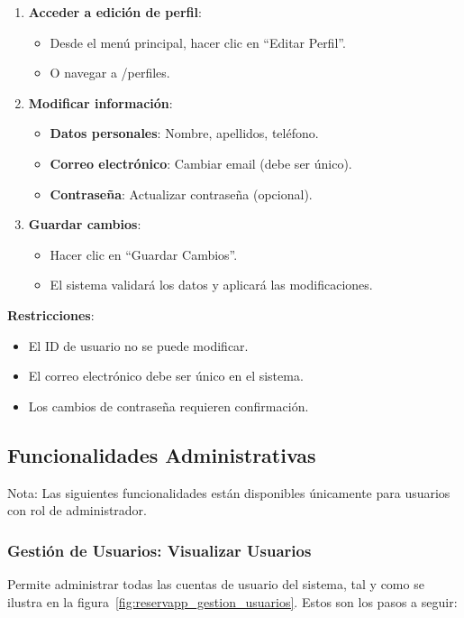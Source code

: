 \begin{enumerate}
   \item \textbf{Acceder a edición de perfil}:
   \begin{itemize}
      \item Desde el menú principal, hacer clic en ``Editar Perfil''.
      \item O navegar a /perfiles.
   \end{itemize}
   \item \textbf{Modificar información}:
   \begin{itemize}
      \item \textbf{Datos personales}: Nombre, apellidos, teléfono.
      \item \textbf{Correo electrónico}: Cambiar email (debe ser único).
	  \item \textbf{Contraseña}: Actualizar contraseña (opcional).
   \end{itemize}
   \item \textbf{Guardar cambios}:
   \begin{itemize}
      \item Hacer clic en ``Guardar Cambios''.
      \item El sistema validará los datos y aplicará las modificaciones.
   \end{itemize}
\end{enumerate}

\textbf{Restricciones}:
\begin{itemize}
   \item El ID de usuario no se puede modificar.
   \item El correo electrónico debe ser único en el sistema.
   \item Los cambios de contraseña requieren confirmación.
\end{itemize}

\subsection{Funcionalidades Administrativas}
Nota: Las siguientes funcionalidades están disponibles únicamente para usuarios con rol de administrador.

\subsubsection{Gestión de Usuarios: Visualizar Usuarios}
Permite administrar todas las cuentas de usuario del sistema, tal y como se ilustra en la figura~\ref{fig:reservapp_gestion_usuarios}. Estos son los pasos a seguir:

